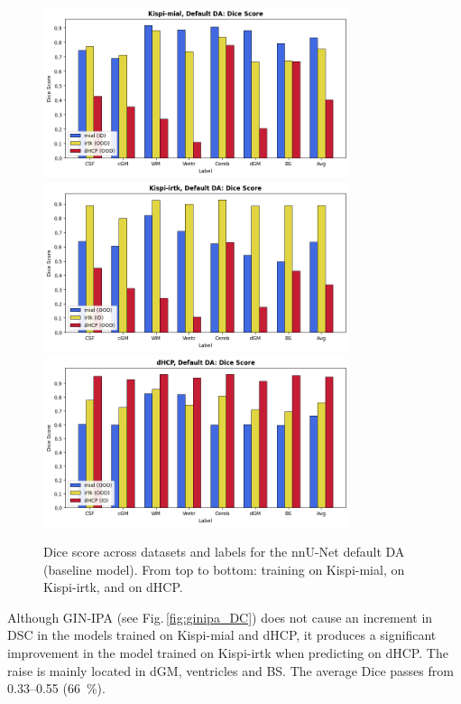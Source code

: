 \begin{figure}[htbp]
    \centering
    \includegraphics[width=0.8\textwidth]{figures/mial_default_DC.png}\\
    \vspace{10pt}
    \includegraphics[width=0.8\textwidth]{figures/irtk_default_DC.png}\\
    \vspace{10pt}
    \includegraphics[width=0.8\textwidth]{figures/dHCP_default_DC.png}
    \caption{Dice score across datasets and labels for the nnU-Net default DA (baseline model). From top to bottom: training on Kispi-mial, on Kispi-irtk, and on dHCP.}
    \label{fig:default_DC}
\end{figure}

Although GIN-IPA (see Fig.\,\ref{fig:ginipa_DC}) does not cause an increment in DSC in the models trained on Kispi-mial and dHCP, it produces a significant improvement in the model trained on Kispi-irtk when predicting on dHCP. The raise is mainly located in dGM, ventricles and BS. The average Dice passes from \numrange{0.33}{0.55} (\qty{+66}{\percent}).

